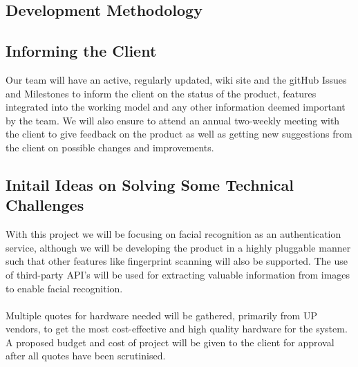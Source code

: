 \subsection{Development Methodology}


\subsection{Informing the Client}
\begin{flushleft}
Our team will have an active, regularly updated, wiki site and the gitHub Issues and Milestones to inform the client on the status of the product, features integrated into the working model and any other information deemed important by the team. We will also ensure to attend an annual two-weekly meeting with the client to give feedback on the product as well as getting new suggestions from the client on possible changes and improvements.
\end{flushleft}

\subsection{Initail Ideas on Solving Some Technical Challenges}
\begin{flushleft}
With this project we will be focusing on facial recognition as an authentication service, although we will be developing the product in a highly pluggable manner such that other features like fingerprint scanning will also be supported. The use of third-party API’s will be used for extracting valuable information from images to enable facial recognition.\\
\hfill \\
Multiple quotes for hardware needed will be gathered, primarily from UP vendors, to get the most cost-effective and high quality hardware for the system. A proposed budget and cost of project will be given to the client for approval after all quotes have been scrutinised.
\end{flushleft}

